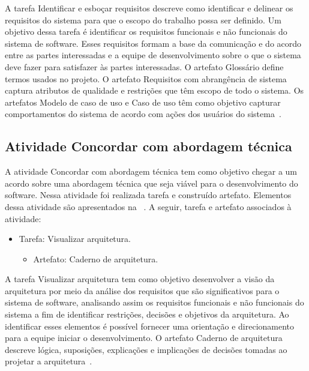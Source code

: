 %

A tarefa Identificar e esboçar requisitos descreve como identificar e delinear os requisitos do sistema para que o escopo do trabalho possa ser definido. Um objetivo dessa tarefa é identificar os requisitos funcionais e não funcionais do sistema de software. Esses requisitos formam a base da comunicação e do acordo entre as partes interessadas e a equipe de desenvolvimento sobre o que o sistema deve fazer para satisfazer às partes interessadas. O artefato Glossário define termos usados no projeto. O artefato Requisitos com abrangência de sistema captura atributos de qualidade e restrições que têm escopo de todo o sistema. Os artefatos Modelo de caso de uso e Caso de uso têm como objetivo capturar comportamentos do sistema de acordo com ações dos usuários do sistema~\cite{openup}.

\subsection{Atividade Concordar com abordagem técnica}

A atividade Concordar com abordagem técnica tem como objetivo chegar a um acordo sobre uma abordagem técnica que seja viável para o desenvolvimento do software. Nessa atividade foi realizada tarefa e construído artefato. Elementos dessa atividade são apresentados na ~. A seguir, tarefa e artefato associados à atividade:

\begin{itemize}
    \item Tarefa: Visualizar arquitetura.
    \begin{itemize}
        \item Artefato: Caderno de arquitetura.
    \end{itemize}
\end{itemize}

%

A tarefa Visualizar arquitetura tem como objetivo desenvolver a visão da arquitetura por meio da análise dos requisitos que são significativos para o sistema de software, analisando assim os requisitos funcionais e não funcionais do sistema a fim de identificar restrições, decisões e objetivos da arquitetura. Ao identificar esses elementos é possível fornecer uma orientação e direcionamento para a equipe iniciar o desenvolvimento. O artefato Caderno de arquitetura descreve lógica, suposições, explicações e implicações de decisões tomadas ao projetar a arquitetura~\cite{openup}.

